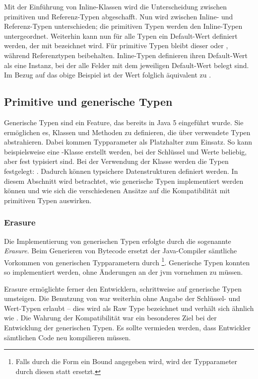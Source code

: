 Mit der Einführung von Inline-Klassen wird die Unterscheidung zwischen primitiven und Referenz-Typen abgeschafft.
Nun wird zwischen Inline- und Referenz-Typen unterschieden;
die primitiven Typen werden den Inline-Typen untergeordnet.
Weiterhin kann nun für alle Typen ein Default-Wert definiert werden, der mit  bezeichnet wird.
Für primitive Typen bleibt dieser  oder , während Referenztypen  beibehalten.
Inline-Typen definieren ihren Default-Wert als eine Instanz, bei der alle Felder mit dem jeweiligen Default-Wert belegt sind.
Im Bezug auf das obige Beispiel ist der Wert  folglich äquivalent zu .

\subsection{Primitive und generische Typen}\label{subsec:primitive-generics}

Generische Typen sind ein Feature, das bereits in Java 5 eingeführt wurde.
Sie ermöglichen es, Klassen und Methoden zu definieren, die über verwendete Typen abstrahieren.
Dabei kommen Typparameter als Platzhalter zum Einsatz.
So kann beispielsweise eine -Klasse erstellt werden, bei der Schlüssel und Werte beliebig, aber fest typisiert sind.
Bei der Verwendung der Klasse werden die Typen festgelegt: .
Dadurch können typsichere Datenstrukturen definiert werden.
In diesem Abschnitt wird betrachtet, wie generische Typen implementiert werden können und wie sich die verschiedenen Ansätze auf die Kompatibilität mit primitiven Typen auswirken.

\subsubsection{Erasure}

Die Implementierung von generischen Typen erfolgte durch die sogenannte \emph{Erasure}.
Beim Generieren von Bytecode ersetzt der Java-Compiler sämtliche Vorkommen von generischen Typparametern durch \footnote{Falls durch die Form  ein Bound angegeben wird, wird der Typparameter durch diesen statt  ersetzt.}.
Generische Typen konnten so implementiert werden, ohne Änderungen an der \ac{jvm} vornehmen zu müssen.

Erasure ermöglichte ferner den Entwicklern, schrittweise auf generische Typen umsteigen.
Die Benutzung von  war weiterhin ohne Angabe der Schlüssel- und Wert-Typen erlaubt -- dies wird als Raw Type bezeichnet und verhält sich ähnlich wie .
Die Wahrung der Kompatibilität war ein besonderes Ziel bei der Entwicklung der generischen Typen.
Es sollte vermieden werden, dass Entwickler sämtlichen Code neu kompilieren müssen.

